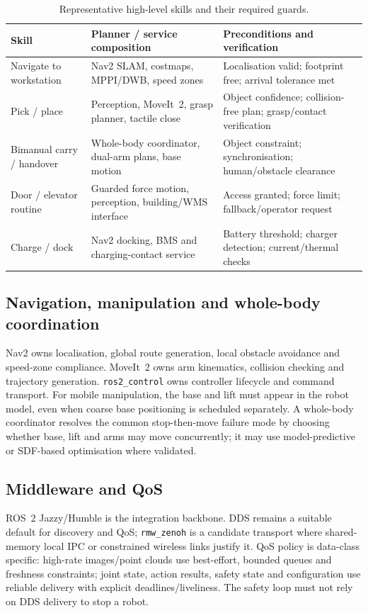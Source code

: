 \documentclass[10pt,a4paper]{article}
\begin{document}
\begin{table}[ht]
\centering\small
\caption{Representative high-level skills and their required guards.}
\begin{tabularx}{\textwidth}{@{}lYY@{}}
\toprule
Skill & Planner / service composition & Preconditions and verification \\
\midrule
Navigate to workstation & Nav2 SLAM, costmaps, MPPI/DWB, speed zones & Localisation valid; footprint free; arrival tolerance met \\
Pick / place & Perception, MoveIt~2, grasp planner, tactile close & Object confidence; collision-free plan; grasp/contact verification \\
Bimanual carry / handover & Whole-body coordinator, dual-arm plans, base motion & Object constraint; synchronisation; human/obstacle clearance \\
Door / elevator routine & Guarded force motion, perception, building/WMS interface & Access granted; force limit; fallback/operator request \\
Charge / dock & Nav2 docking, BMS and charging-contact service & Battery threshold; charger detection; current/thermal checks \\
\bottomrule
\end{tabularx}
\end{table}

\subsection{Navigation, manipulation and whole-body coordination}
Nav2 owns localisation, global route generation, local obstacle avoidance and speed-zone compliance. MoveIt~2 owns arm kinematics, collision checking and trajectory generation. \texttt{ros2\_control} owns controller lifecycle and command transport. For mobile manipulation, the base and lift must appear in the robot model, even when coarse base positioning is scheduled separately. A whole-body coordinator resolves the common stop-then-move failure mode by choosing whether base, lift and arms may move concurrently; it may use model-predictive or SDF-based optimisation where validated.\cite{bonci,liwb}

\subsection{Middleware and QoS}
ROS~2 Jazzy/Humble is the integration backbone. DDS remains a suitable default for discovery and QoS; \texttt{rmw\_zenoh} is a candidate transport where shared-memory local IPC or constrained wireless links justify it. QoS policy is data-class specific: high-rate images/point clouds use best-effort, bounded queues and freshness constraints; joint state, action results, safety state and configuration use reliable delivery with explicit deadlines/liveliness. The safety loop must not rely on DDS delivery to stop a robot.
\end{document}
